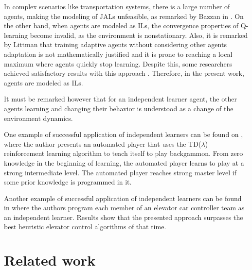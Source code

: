 \documentclass{RITA}
\begin{document}
In complex scenarios like transportation systems, there is a large number of agents, making the modeling of JALs unfeasible, as remarked by Bazzan in \cite{Bazzan2009}. On the other hand, when agents are modeled as ILs, the convergence properties of Q-learning become invalid, as the environment is nonstationary. Also, it is remarked by Littman \cite{Littman1994} that training adaptive agents without considering other agents adaptation is not mathematically justified and it is prone to reaching a local maximum where agents quickly stop learning. Despite this, some researchers achieved satisfactory results with this approach \cite{Littman1994}. Therefore, in the present work, agents are modeled as ILs.

It must be remarked however that for an independent learner agent, the other agents learning and changing their behavior is understood as a change of the environment dynamics.  %

One example of successful application of independent learners can be found on \cite{Tesauro1994}, where the author presents an automated player that uses the TD($\lambda$) reinforcement learning algorithm \cite{Sutton1988} to teach itself to play backgammon. From zero knowledge in the beginning of learning, the automated player learns to play at a strong intermediate level. The automated player reaches strong master level if some prior knowledge is programmed in it. 

Another example of successful application of independent learners can be found in \cite{Crites&Barto1998} where the authors program each member of an elevator car controller team as an independent learner. Results show that the presented approach surpasses the best heuristic elevator control algorithms of that time.




\section{Related work}
\label{sec:related}
\end{document}
